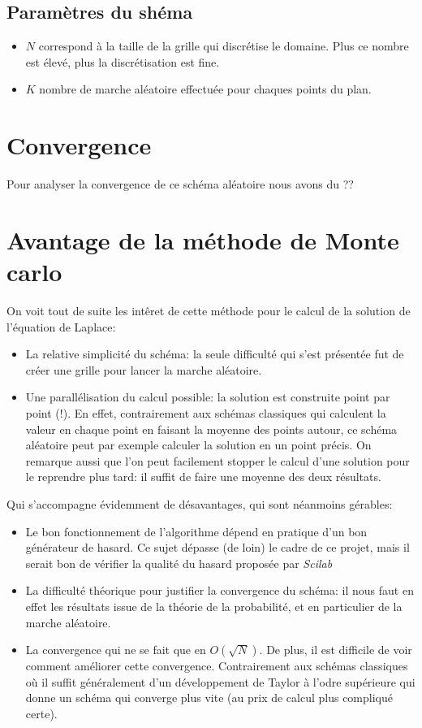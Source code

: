 \documentclass[11pt, a4paper]{article}
\begin{document}
\subsection{Paramètres du shéma}

\begin{itemize}
	\item $N$ correspond à la taille de la grille qui discrétise le domaine. Plus ce nombre est
		élevé, plus la discrétisation est fine.
	\item $K$ nombre de marche aléatoire effectuée pour chaques points du plan.
\end{itemize}

\section{Convergence}

Pour analyser la convergence de ce schéma aléatoire nous avons du ??

\section{Avantage de la méthode de Monte carlo}

On voit tout de suite les intêret de cette méthode pour le calcul de la solution de l'équation de
Laplace:
\begin{itemize}
	\item La relative simplicité du schéma: la seule difficulté qui s'est présentée fut de créer
		une grille pour lancer la marche aléatoire.
	\item Une parallélisation du calcul possible: la solution est construite point par point
		(!). En effet, contrairement aux schémas classiques qui calculent la valeur en
		chaque point en faisant la moyenne des points autour, ce schéma aléatoire peut par
		exemple calculer la solution en un point précis. On remarque aussi que l'on peut
		facilement stopper le calcul d'une solution pour le reprendre plus tard: il suffit
		de faire une moyenne des deux résultats.
\end{itemize}
Qui s'accompagne évidemment de désavantages, qui sont néanmoins gérables:
\begin{itemize}
	\item Le bon fonctionnement de l'algorithme dépend en pratique d'un bon générateur de
		hasard. Ce sujet dépasse (de loin) le cadre de ce projet, mais il serait bon de
		vérifier la qualité du hasard proposée par \emph{Scilab}

	\item La difficulté théorique pour justifier la convergence du schéma: il nous faut en effet
		les résultats issue de la théorie de la probabilité, et en particulier de la marche
		aléatoire.
	\item La convergence qui ne se fait que en $O(\sqrt{N})$. De plus, il est difficile de voir
		comment améliorer cette convergence. Contrairement aux schémas classiques où il
		suffit généralement d'un développement de Taylor à l'odre supérieure qui donne un
		schéma qui converge plus vite (au prix de calcul plus compliqué certe).
\end{itemize}
\end{document}
